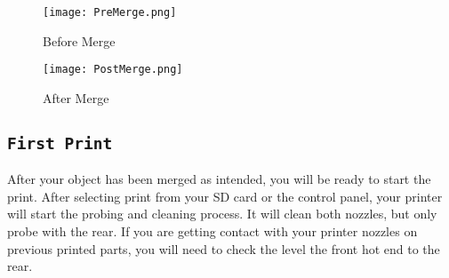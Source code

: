 \begin{figure}[H]
\centering
\texttt{[image: PreMerge.png]}
\caption{Before Merge}
\label{fig:Before Merge}
\end{figure}

\begin{figure}[H]
\centering
\texttt{[image: PostMerge.png]}
\caption{After Merge}
\label{fig:After Merge}
\end{figure}

\subsection{\texttt{First Print}}
After your object has been merged as intended, you will be ready to start the print. After selecting print from your SD card or the control panel, your printer will start the probing and cleaning process. It will clean both nozzles, but only probe with the rear. If you are getting contact with your printer nozzles on previous printed parts, you will need to check the level the front hot end to the rear.

